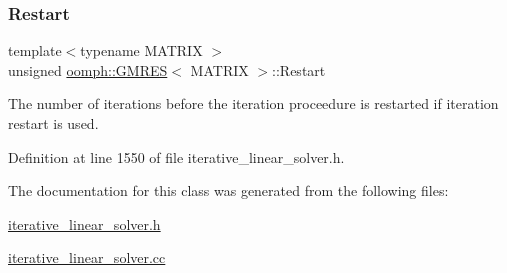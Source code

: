 \subsubsection{\texorpdfstring{Restart}{Restart}}
{\footnotesize\ttfamily template$<$typename M\+A\+T\+R\+IX $>$ \\
unsigned \hyperlink{classoomph_1_1GMRES}{oomph\+::\+G\+M\+R\+ES}$<$ M\+A\+T\+R\+IX $>$\+::Restart\hspace{0.3cm}{\ttfamily [private]}}



The number of iterations before the iteration proceedure is restarted if iteration restart is used. 



Definition at line 1550 of file iterative\+\_\+linear\+\_\+solver.\+h.



The documentation for this class was generated from the following files\+:\begin{DoxyCompactItemize}
\item 
\hyperlink{iterative__linear__solver_8h}{iterative\+\_\+linear\+\_\+solver.\+h}\item 
\hyperlink{iterative__linear__solver_8cc}{iterative\+\_\+linear\+\_\+solver.\+cc}\end{DoxyCompactItemize}
